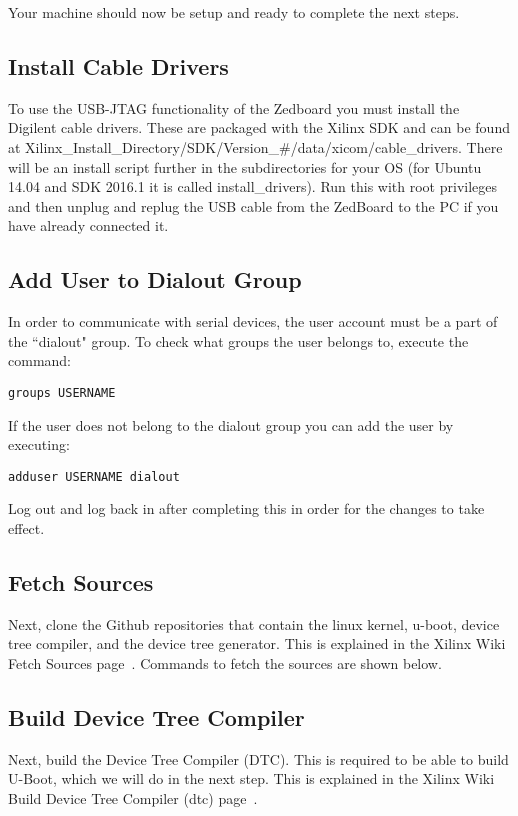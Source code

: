 \documentclass[thesis.tex]{subfile}
\begin{document}
Your machine should now be setup and ready to complete the next steps.

\subsection{Install Cable Drivers}
To use the USB-JTAG functionality of the Zedboard you must install the Digilent cable drivers. These are packaged with the Xilinx SDK and can be found at Xilinx\_Install\_Directory/SDK/Version\_\#/data/xicom/cable\_drivers. There will be an install script further in the subdirectories for your OS (for Ubuntu 14.04 and SDK 2016.1 it is called install\_drivers). Run this with root privileges and then unplug and replug the USB cable from the ZedBoard to the PC if you have already connected it.

\subsection{Add User to Dialout Group}
In order to communicate with serial devices, the user account must be a part of the ``dialout" group. To check what groups the user belongs to, execute the command: 
\begin{lstlisting}
groups USERNAME
\end{lstlisting}
If the user does not belong to the dialout group you can add the user by executing:
\begin{lstlisting}
adduser USERNAME dialout
\end{lstlisting}

Log out and log back in after completing this in order for the changes to take effect.

\subsection{Fetch Sources}
Next, clone the Github repositories that contain the linux kernel, u-boot, device tree compiler, and the device tree generator. This is explained in the Xilinx Wiki Fetch Sources page~\cite{FetchSources}. Commands to fetch the sources are shown below.



\subsection{Build Device Tree Compiler}
Next, build the Device Tree Compiler (DTC). This is required to be able to build U-Boot, which we will do in the next step. This is explained in the Xilinx Wiki Build Device Tree Compiler (dtc) page~\cite{BuildDTC}.
\end{document}

